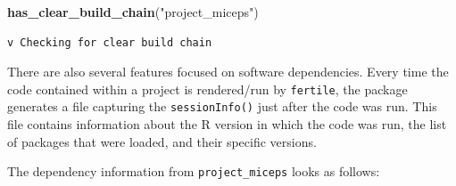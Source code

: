 \documentclass[12pt,twoside]{reedthesis}
\newenvironment{Shaded}{\begin{snugshade}}{\end{snugshade}}
\newcommand{\KeywordTok}[1]{\textcolor[rgb]{0.13,0.29,0.53}{\textbf{#1}}}
\newcommand{\StringTok}[1]{\textcolor[rgb]{0.31,0.60,0.02}{#1}}
\newcommand{\NormalTok}[1]{#1}
\begin{document}
\footnotesize
\begin{Shaded}
\begin{Highlighting}[]
\KeywordTok{has_clear_build_chain}\NormalTok{(}\StringTok{"project_miceps"}\NormalTok{)}
\end{Highlighting}
\end{Shaded}
\begin{verbatim}
v Checking for clear build chain
\end{verbatim}
\normalsize

There are also several features focused on software dependencies. Every
time the code contained within a project is rendered/run by
\texttt{fertile}, the package generates a file capturing the
\texttt{sessionInfo()} just after the code was run. This file contains
information about the R version in which the code was run, the list of
packages that were loaded, and their specific versions.

The dependency information from \texttt{project\_miceps} looks as
follows:
\end{document}

